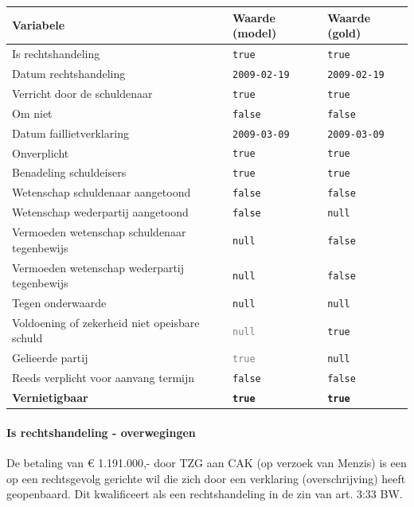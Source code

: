 \documentclass[
  dutch,
  a4paper,
]{article}
\begin{document}
\begin{center}
\small
\begin{tabular}{@{}p{7.4cm}p{2.6cm}p{2.6cm}@{}}
\toprule
Variabele & Waarde (model) & Waarde (gold) \\
\midrule
Is rechtshandeling & \texttt{true} & \texttt{true} \\
Datum rechtshandeling & \texttt{2009-02-19} & \texttt{2009-02-19} \\
Verricht door de schuldenaar & \texttt{true} & \texttt{true} \\
Om niet & \texttt{false} & \texttt{false} \\
Datum faillietverklaring & \texttt{2009-03-09} & \texttt{2009-03-09} \\
Onverplicht & \texttt{true} & \texttt{true} \\
Benadeling schuldeisers & \texttt{true} & \texttt{true} \\
Wetenschap schuldenaar aangetoond & \texttt{false} & \texttt{false} \\
Wetenschap wederpartij aangetoond & \texttt{false} & \texttt{null} \\
Vermoeden wetenschap schuldenaar tegenbewijs & \texttt{null} & \texttt{false} \\
Vermoeden wetenschap wederpartij tegenbewijs & \texttt{null} & \texttt{false} \\
Tegen onderwaarde & \texttt{null} & \texttt{null} \\
Voldoening of zekerheid niet opeisbare schuld & \textcolor{gray}{\texttt{null}} & \texttt{true} \\
Gelieerde partij & \textcolor{gray}{\texttt{true}} & \texttt{null} \\
Reeds verplicht voor aanvang termijn & \texttt{false} & \texttt{false} \\
\textbf{Vernietigbaar} & \textbf{\texttt{true}} & \textbf{\texttt{true}} \\
\bottomrule
\end{tabular}
\end{center}

\paragraph{Is rechtshandeling - overwegingen}\label{is-rechtshandeling---overwegingen-81}

De betaling van € 1.191.000,- door TZG aan CAK (op verzoek van Menzis) is een op een rechtsgevolg gerichte wil die zich door een verklaring (overschrijving) heeft geopenbaard. Dit kwalificeert als een rechtshandeling in de zin van art. 3:33 BW.
\end{document}
